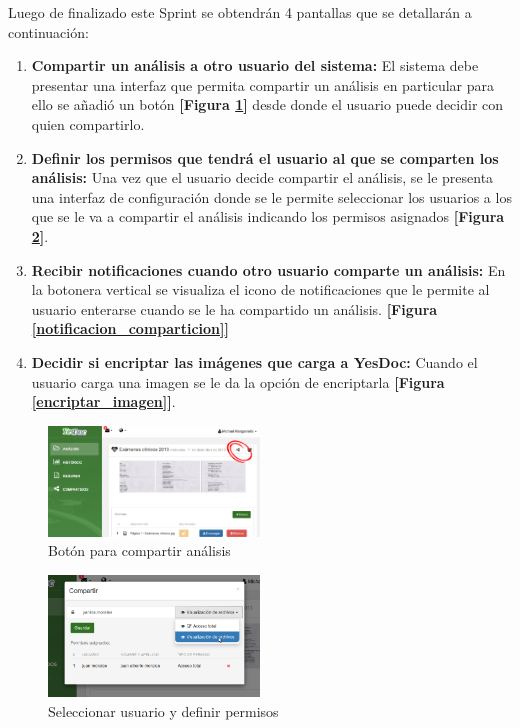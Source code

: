 Luego de finalizado este Sprint se obtendrán 4 pantallas que se detallarán a continuación:
\begin{enumerate}
		\item \textbf{Compartir un análisis a otro usuario del sistema: } El sistema debe presentar una interfaz que permita compartir un análisis en particular para ello se añadió un botón \textbf{[Figura \ref{compartir_analisis}]} desde donde el usuario puede decidir con quien compartirlo.
		
		\item \textbf{Definir los permisos que tendrá el usuario al que se comparten los análisis: } Una vez que el usuario decide compartir el análisis, se le presenta una interfaz de configuración donde se le permite seleccionar los usuarios a los que se le va a compartir el análisis indicando los permisos asignados \textbf{[Figura \ref{config_comparticion}]}.
		
		\item \textbf{Recibir notificaciones cuando otro usuario comparte un análisis:}  En la botonera vertical se visualiza el icono de notificaciones que le permite al  usuario enterarse cuando se le ha compartido un análisis. \textbf{[Figura \ref{notificacion_comparticion}]}
		
		\item \textbf{Decidir si encriptar las imágenes que carga a YesDoc: } Cuando el usuario carga una imagen se le da la opción de encriptarla \textbf{[Figura \ref{encriptar_imagen}]}.
		
			
\end{enumerate}


    \begin{figure}[h]
    	\centering
    	\includegraphics[width=0.5\textwidth]{img/compartir_analisis}
    	\caption{Botón para compartir análisis}
    	\label{compartir_analisis}
    \end{figure}


    \begin{figure}[h]
    	\centering
    	\includegraphics[width=0.5\textwidth]{img/config_comparticion}
    	\caption{Seleccionar usuario y definir permisos}
    	\label{config_comparticion}
    \end{figure}
    
